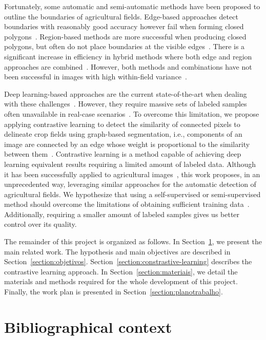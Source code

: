 \documentclass[12pt]{article}
\begin{document}
Fortunately, some automatic and semi-automatic methods have been proposed to outline the boundaries of agricultural fields. Edge-based approaches detect boundaries with reasonably good accuracy however fail when forming closed polygons~\cite{taravat2021,waldner2021}. Region-based methods are more successful when producing closed polygons, but often do not place boundaries at the visible edges~\cite{taravat2021}. There is a significant increase in efficiency in hybrid methods where both edge and region approaches are combined~\cite{garcia2017}. However, both methods and combinations have not been successful in images with high within-field variance~\cite{mueller2004,zhang2021}.

Deep learning-based approaches are the current state-of-the-art when dealing with these challenges~\citep{waldner2021,zhang2021}. However, they require massive sets of labeled samples often unavailable in real-case scenarios~\cite{kokkinos2016, ma2019,kamilaris2018}. 
To overcome this limitation, we propose applying contrastive learning to detect the similarity of connected pixels to delineate crop fields using graph-based segmentation, i.e., components of an image are connected by an edge whose weight is proportional to the similarity between them~\citep{felzenszwalb2004}. Contrastive learning is a method capable of achieving deep learning equivalent results requiring a limited amount of labeled data. Although it has been successfully applied to agricultural images~\cite{guldenring2021,jansel2021}, this work proposes, in an unprecedented way, leveraging similar approaches for the automatic detection of agricultural fields. We hypothesize that using a self-supervised or semi-supervised method should overcome the limitations of obtaining sufficient training data~\citep{yang2020}. Additionally, requiring a smaller amount of labeled samples gives us better control over its quality.

The remainder of this project is organized as follows. In Section~\ref{section:bibliografia}, we present the main related work. The hypothesis and main objectives are described in Section~\ref{section:objetivos}. Section~\ref{section:constrastive-learning} describes the contrastive learning approach. In Section~\ref{section:materiais}, we detail the materials and methods required for the whole development of this project. Finally, the work plan is presented in Section~\ref{section:planotrabalho}.

\section{Bibliographical context}\label{section:bibliografia}
\end{document}
